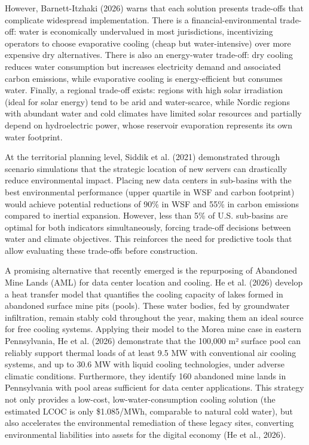 \documentclass[conference]{IEEEtran}
\begin{document}
However, Barnett-Itzhaki (2026) warns that each solution presents trade-offs that complicate widespread implementation. There is a financial-environmental trade-off: water is economically undervalued in most jurisdictions, incentivizing operators to choose evaporative cooling (cheap but water-intensive) over more expensive dry alternatives. There is also an energy-water trade-off: dry cooling reduces water consumption but increases electricity demand and associated carbon emissions, while evaporative cooling is energy-efficient but consumes water. Finally, a regional trade-off exists: regions with high solar irradiation (ideal for solar energy) tend to be arid and water-scarce, while Nordic regions with abundant water and cold climates have limited solar resources and partially depend on hydroelectric power, whose reservoir evaporation represents its own water footprint.

At the territorial planning level, Siddik et al. (2021) demonstrated through scenario simulations that the strategic location of new servers can drastically reduce environmental impact. Placing new data centers in sub-basins with the best environmental performance (upper quartile in WSF and carbon footprint) would achieve potential reductions of 90\% in WSF and 55\% in carbon emissions compared to inertial expansion. However, less than 5\% of U.S. sub-basins are optimal for both indicators simultaneously, forcing trade-off decisions between water and climate objectives. This reinforces the need for predictive tools that allow evaluating these trade-offs before construction.

A promising alternative that recently emerged is the repurposing of Abandoned Mine Lands (AML) for data center location and cooling. He et al. (2026) develop a heat transfer model that quantifies the cooling capacity of lakes formed in abandoned surface mine pits (pools). These water bodies, fed by groundwater infiltration, remain stably cold throughout the year, making them an ideal source for free cooling systems. Applying their model to the Morea mine case in eastern Pennsylvania, He et al. (2026) demonstrate that the 100,000 m² surface pool can reliably support thermal loads of at least 9.5 MW with conventional air cooling systems, and up to 30.6 MW with liquid cooling technologies, under adverse climatic conditions. Furthermore, they identify 160 abandoned mine lands in Pennsylvania with pool areas sufficient for data center applications. This strategy not only provides a low-cost, low-water-consumption cooling solution (the estimated LCOC is only \$1.085/MWh, comparable to natural cold water), but also accelerates the environmental remediation of these legacy sites, converting environmental liabilities into assets for the digital economy (He et al., 2026).
\end{document}
